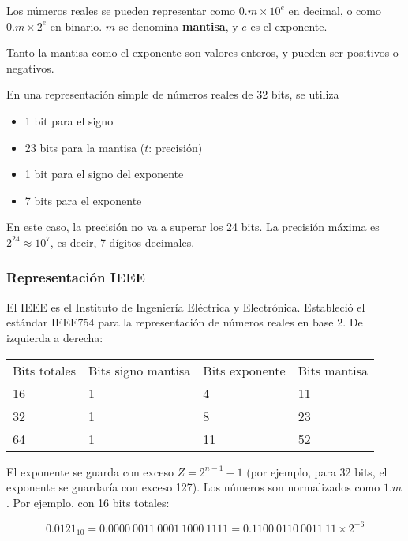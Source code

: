 \documentclass{article}
\begin{document}
Los números reales se pueden representar como $0.m\times10^e$ en decimal, o como
$0.m\times2^e$ en binario. $m$ se denomina \textbf{mantisa}, y $e$ es el 
exponente.

Tanto la mantisa como el exponente son valores enteros, y pueden ser positivos o
negativos.

En una representación simple de números reales de 32 bits, se utiliza

\begin{itemize}
    \item 1 bit para el signo
    \item 23 bits para la mantisa ($t$: precisión)
    \item 1 bit para el signo del exponente
    \item 7 bits para el exponente
\end{itemize}

En este caso, la precisión no va a superar los 24 bits. La precisión máxima es
$2^{24}\approx10^7$, es decir, 7 dígitos decimales.

\subsubsection{Representación IEEE}

El IEEE es el Instituto de Ingeniería Eléctrica y Electrónica. Estableció el
estándar IEEE754 para la representación de números reales en base 2. De 
izquierda a derecha:

\begin{table}[h]
\centering
\begin{tabular}{llll}
Bits totales & Bits signo mantisa & Bits exponente & Bits mantisa \\
16           & 1                  & 4              & 11           \\
32           & 1                  & 8              & 23           \\
64           & 1                  & 11             & 52          
\end{tabular}
\end{table}

El exponente se guarda con exceso $Z=2^{n-1}-1$ (por ejemplo, para 32 bits, el 
exponente se guardaría con exceso 127). Los números son normalizados como $1.m$.
Por ejemplo, con 16 bits totales:

\begin{equation*}
0.0121_{10} = 0.0000\ 0011\ 0001\ 1000\ 1111 = 0.1100\ 0110\ 0011\ 11\times2^{-6}
\end{equation*}
\end{document}
